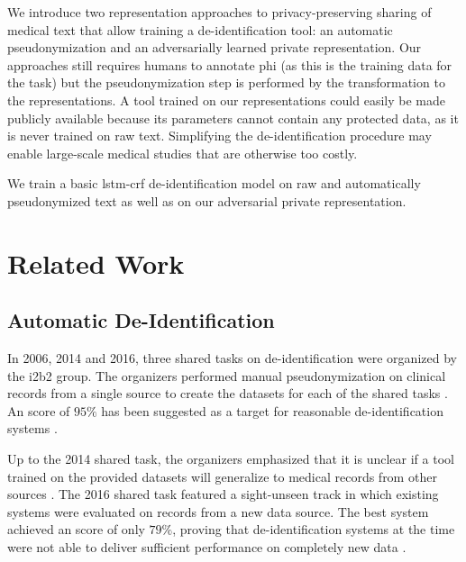 %
We introduce two representation approaches to privacy-preserving sharing of medical text that allow training a de-identification tool: an automatic pseudonymization and an adversarially learned private representation.
%
Our approaches still requires humans to annotate \ac{phi} (as this is the training data for the task) but the pseudonymization step is performed by the transformation to the representations.
%
A tool trained on our representations could easily be made publicly available because its parameters cannot contain any protected data, as it is never trained on raw text.
%
Simplifying the de-identification procedure may enable large-scale medical studies that are otherwise too costly.

We train a basic \acs{lstm}-\acs{crf} de-identification model on raw and automatically pseudonymized text as well as on our adversarial private representation.
%

\section{Related Work}\label{sec:related}
%


\subsection{Automatic De-Identification}
%
In 2006, 2014 and 2016, three shared tasks on de-identification were organized by the i2b2 group.
%
The organizers performed manual pseudonymization on clinical records from a single source to create the datasets for each of the shared tasks \citep{stubbs2015annotating}.
%
An \fone score of $95\%$ has been suggested as a target for reasonable de-identification systems \citep{stubbs2015automated}.

%
Up to the 2014 shared task, the organizers emphasized that it is unclear if a tool trained on the provided datasets will generalize to medical records from other sources \citep{uzuner2007evaluating,stubbs2015automated}.
%
The 2016 shared task featured a sight-unseen track in which existing systems were evaluated on records from a new data source.
%
The best system achieved an \fone score of only $79\%$, proving that de-identification systems at the time were not able to deliver sufficient performance on completely new data \citep{stubbs2017identification}.

